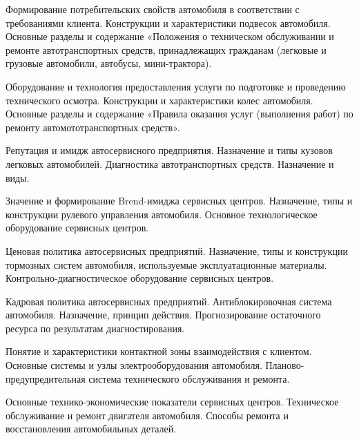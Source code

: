 \documentclass[
	11pt,
	a4paper,
	]
	{article}
\begin{document}
\bigskip

\noindent{} 
	{
		Формирование потребительских свойств автомобиля в соответствии с требованиями клиента.
	}{
		Конструкции и характеристики подвесок автомобиля.
	}{
		Основные разделы и содержание «Положения о техническом обслуживании и ремонте автотранспортных средств, принадлежащих гражданам (легковые и грузовые автомобили, автобусы, мини-трактора).
	}

\bigskip

\noindent{} 
	{
		Оборудование и технология предоставления услуги по подготовке и проведению технического осмотра.
	}{
		Конструкции и характеристики колес автомобиля.
	}{
		Основные разделы и содержание «Правила оказания услуг (выполнения работ) по ремонту автомототранспортных средств».
	}

\bigskip

\noindent{} 
	{
		Репутация и имидж автосервисного предприятия.
	}{
		Назначение и типы кузовов легковых автомобилей.
	}{
		Диагностика автотранспортных средств. Назначение и виды.
	}

\bigskip

\noindent{} 
	{
		Значение и формирование Brend-имиджа сервисных центров.
	}{
		Назначение, типы и конструкции рулевого управления автомобиля.
	}{
		Основное технологическое оборудование сервисных центров.
	}

\bigskip

\noindent{} 
	{
		Ценовая политика автосервисных предприятий.
	}{
		Назначение, типы и конструкции тормозных систем автомобиля, используемые эксплуатационные материалы.
	}{
		Контрольно-диагностическое оборудование сервисных центров.
	}

\bigskip

\noindent{} 
	{
		Кадровая политика автосервисных предприятий.
	}{
		Антиблокировочная система автомобиля. Назначение, принцип действия.
	}{
		Прогнозирование остаточного ресурса по результатам диагностирования.
	}

\bigskip

\noindent{} 
	{
		Понятие и характеристики контактной зоны взаимодействия с клиентом.
	}{
		Основные системы и узлы электрооборудования автомобиля.
	}{
		Планово-предупредительная система технического обслуживания и ремонта.
	}

\bigskip

\noindent{} 
	{
		Основные технико-экономические показатели сервисных центров.
	}{
		Техническое обслуживание и ремонт двигателя автомобиля.
	}{
		Способы ремонта и восстановления автомобильных деталей.
	}
\end{document}
